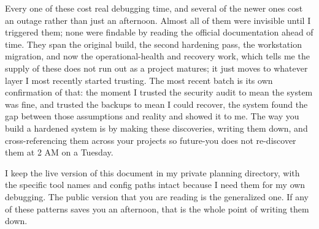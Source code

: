 \documentclass[12pt]{article}
\begin{document}
Every one of these cost real debugging time, and several of the newer ones cost an outage rather than just an afternoon. Almost all of them were invisible until I triggered them; none were findable by reading the official documentation ahead of time. They span the original build, the second hardening pass, the workstation migration, and now the operational-health and recovery work, which tells me the supply of these does not run out as a project matures; it just moves to whatever layer I most recently started trusting. The most recent batch is its own confirmation of that: the moment I trusted the security audit to mean the system was fine, and trusted the backups to mean I could recover, the system found the gap between those assumptions and reality and showed it to me. The way you build a hardened system is by making these discoveries, writing them down, and cross-referencing them across your projects so future-you does not re-discover them at 2 AM on a Tuesday.

I keep the live version of this document in my private planning directory, with the specific tool names and config paths intact because I need them for my own debugging. The public version that you are reading is the generalized one. If any of these patterns saves you an afternoon, that is the whole point of writing them down.
\end{document}
